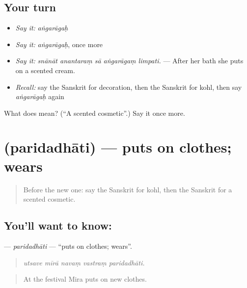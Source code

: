 \subsection*{Your turn}
\begin{itemize}
\raggedright
  \item \emph{Say it:} \emph{aṅgarāgaḥ}
  \item \emph{Say it:} \emph{aṅgarāgaḥ}, once more
  \item \emph{Say it:} \emph{snānāt anantaraṃ sā aṅgarāgaṃ limpati.} — After her bath she puts on a scented cream.
  \item \emph{Recall:} say the Sanskrit for decoration, then the Sanskrit for kohl, then say \emph{aṅgarāgaḥ} again
\end{itemize}

\begin{tcolorbox}[breakable,colback=teal!4,colframe=teal!35!black,title={Before you move on}]
What does  mean? (\textquotedblleft{}A scented cosmetic\textquotedblright{}.) Say it once more.
\end{tcolorbox}
\section[\texorpdfstring{\sk{परिदधाति} (paridadhāti)}{परिदधाति (paridadhāti)}]{ (paridadhāti) — puts on clothes; wears}

\label{lesson:SA-C487-paridadhati}



\begin{quote}
Before the new one: say the Sanskrit for kohl, then the Sanskrit for a scented cosmetic.
\end{quote}

\subsection*{You'll want to know: }
\textbf{} — \emph{paridadhāti} — \textquotedblleft{}puts on clothes; wears\textquotedblright{}.

\begin{quote}
    
\end{quote}

\begin{quote}
\emph{utsave mīrā navaṃ vastraṃ paridadhāti.}
\end{quote}

\begin{quote}
At the festival Mira puts on new clothes.
\end{quote}

